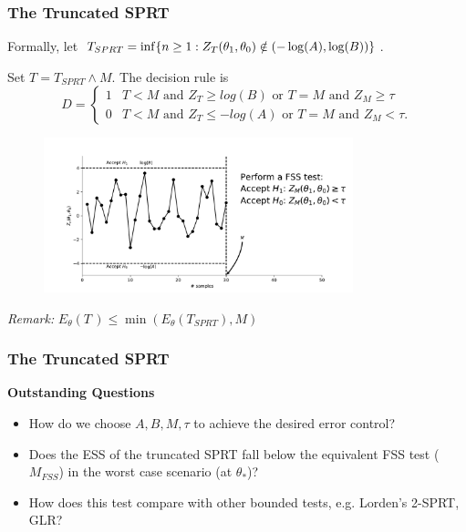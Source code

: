 \documentclass[10pt]{beamer}
\begin{document}
\begin{frame}
\frametitle{The Truncated SPRT}

Formally, let $T_{SPRT} = \inf\{n \geq 1 : Z_{T}(\theta_1, \theta_0) \notin (-\log(A), \log(B)) \}$.

Set $T = T_{SPRT} \wedge M$. The decision rule is
\[
D =
\begin{cases}
1  & T < M \text{ and } Z_T \geq log(B) \text{ or } T = M \text{ and } Z_M \geq \tau \\
0  & T < M \text{ and } Z_T \leq -log(A) \text{ or } T = M \text{ and } Z_M < \tau .
\end{cases}
\]

\begin{figure}
\centering
\includegraphics[height=0.45\textheight, width=0.8\textwidth]{images/truncated_sprt}
\end{figure}

\textit{Remark:} $E_{\theta}(T\,) \leq \min(E_{\theta}(T_{SPRT}), M)$
\end{frame}

\begin{frame}
\frametitle{The Truncated SPRT}
\textbf{Outstanding Questions}

\begin{itemize}
\item How do we choose $A, B, M, \tau$ to achieve the desired error control?
\item Does the ESS of the truncated SPRT fall below the equivalent FSS test ($M_{FSS}$) in the worst case scenario (at $\theta_{*}$)?
\item How does this test compare with other bounded tests, e.g. Lorden's 2-SPRT, GLR?
\end{itemize}

\end{frame}
\end{document}
